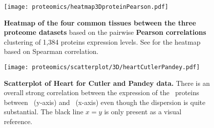 \begin{comment}
\pancreas\ & ENSG00000141086 & CTRL \\
\pancreas\ & ENSG00000143954 & REG3G \\
\pancreas\ & ENSG00000187021 & PNLIPRP1 \\
\pancreas\ & ENSG00000215704 & CELA2B \\
\pancreas\ & ENSG00000266200 & PNLIPRP2 \\
\placenta\ & ENSG00000105825 & TFPI2 \\
\placenta\ & ENSG00000116183 & PAPPA2 \\
\placenta\ & ENSG00000137868 & STRA6 \\
\placenta\ & ENSG00000148848 & ADAM12 \\
\placenta\ & ENSG00000163283 & ALPP \\
\placenta\ & ENSG00000172296 & SPTLC3 \\
\placenta\ & ENSG00000172901 &  \\
\placenta\ & ENSG00000183668 & PSG9 \\
\placenta\ & ENSG00000243137 & PSG4 \\
\prostate\ & ENSG00000044524 & EPHA3 \\
\prostate\ & ENSG00000103710 & RASL12 \\
\rectum\   & ENSG00000205277 & MUC12 \\
\testis\   & ENSG00000052841 & TTC17 \\
\testis\   & ENSG00000109762 & SNX25 \\
\testis\   & ENSG00000130948 & HSD17B3 \\
\testis\   & ENSG00000160310 & PRMT2 \\* \bottomrule
\end{longtable}
\end{comment}
\begin{figure}[!htbp]
    \texttt{[image: proteomics/heatmap3DproteinPearson.pdf]}\centering
    \vspace{-4mm}
    \caption[Heatmap of the 4 common tissues between the three proteome
    datasets (Pearson correlation)]{\label{fig:prot3DheatmapPears}\textbf{Heatmap
    of the four common tissues between the three proteome datasets}
    based on the pairwise \textbf{Pearson correlations} clustering of
    1,384 proteins expression levels.
    See  for the heatmap based on Spearman correlation.}
\end{figure}

\begin{figure}[!htpb]
    \texttt{[image: proteomics/scatterplot/3D/heartCutlerPandey.pdf]}\centering
    \caption[Heart: Cutler vs Pandey]{\label{fig:scat3DheartCutlerPandey}\textbf{%
    Scatterplot of Heart for Cutler and Pandey data.}
    There is an overall strong correlation between
    the expression of the \heart\ proteins
    between \pandey\ (y-axis) and \cutler\ (x-axis)
    even though the dispersion is quite substantial.
    {\small The black line $x=y$ is only present as a visual reference.}}
\end{figure}

